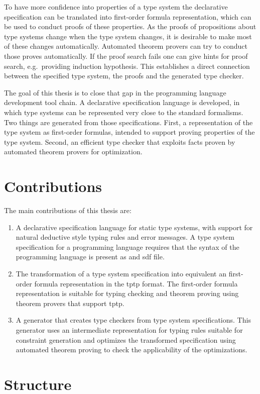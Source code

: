 To have more confidence into properties of a type system the
declarative specification can be translated into first-order formula
representation, which can be used to conduct proofs of these
properties. As the proofs of propositions about type systems change
when the type system changes, it is desirable to make most of these
changes automatically. Automated theorem provers can try to conduct
those proves automatically. If the proof search fails one can give
hints for proof search, e.g.\ providing induction hypothesis. This
establishes a direct connection between the specified type system, the
proofs and the generated type checker.

The goal of this thesis is to close that gap in the programming
language development tool chain. A declarative specification language
is developed, in which type systems can be represented very close to
the standard formalisms. Two things are generated from those
specifications. First, a representation of the type system as
first-order formulas, intended to support proving properties of the
type system. Second, an efficient type checker that exploits facts
proven by automated theorem provers for optimization.
\section{Contributions}
The main contributions of this thesis are:
\begin{enumerate}
\item A declarative specification language for static type systems,
  with support for natural deductive style typing rules and error
  messages. A type system specification for a programming language
  requires that the syntax of the programming language is present as
  and \gls{sdf} file.
\item The transformation of a type system specification into
  equivalent an first-order formula representation in the \gls{tptp}
  format. The first-order formula representation is suitable for
  typing checking and theorem proving using theorem provers that
  support \gls{tptp}.
\item A generator that creates type checkers from type system
  specifications. This generator uses an intermediate representation
  for typing rules suitable for constraint generation and optimizes
  the transformed specification using automated theorem proving to
  check the applicability of the optimizations.
\end{enumerate}

\section{Structure}

